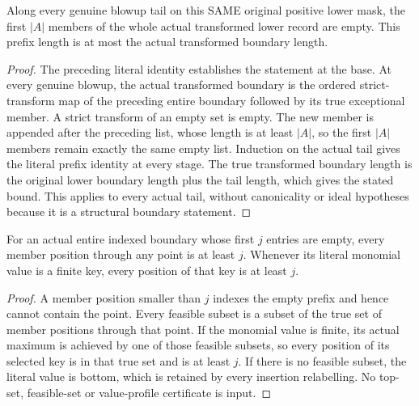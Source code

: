 \begin{lemma}
\label{hir:member-future-tail}
\leanok
Along every genuine blowup tail on this SAME original positive lower mask, the first $|A|$ members of the whole actual transformed lower record are empty. This prefix length is at most the actual transformed boundary length.
\end{lemma}
\begin{proof}
The preceding literal identity establishes the statement at the base. At every genuine blowup, the actual transformed boundary is the ordered strict-transform map of the preceding entire boundary followed by its true exceptional member. A strict transform of an empty set is empty. The new member is appended after the preceding list, whose length is at least $|A|$, so the first $|A|$ members remain exactly the same empty list. Induction on the actual tail gives the literal prefix identity at every stage. The true transformed boundary length is the original lower boundary length plus the tail length, which gives the stated bound. This applies to every actual tail, without canonicality or ideal hypotheses because it is a structural boundary statement.
\end{proof}

\begin{lemma}
\label{hir:member-future-top}
\leanok
For an actual entire indexed boundary whose first $j$ entries are empty, every member position through any point is at least $j$. Whenever its literal monomial value is a finite key, every position of that key is at least $j$.
\end{lemma}
\begin{proof}
A member position smaller than $j$ indexes the empty prefix and hence cannot contain the point. Every feasible subset is a subset of the true set of member positions through that point. If the monomial value is finite, its actual maximum is achieved by one of those feasible subsets, so every position of its selected key is in that true set and is at least $j$. If there is no feasible subset, the literal value is bottom, which is retained by every insertion relabelling. No top-set, feasible-set or value-profile certificate is input.
\end{proof}

